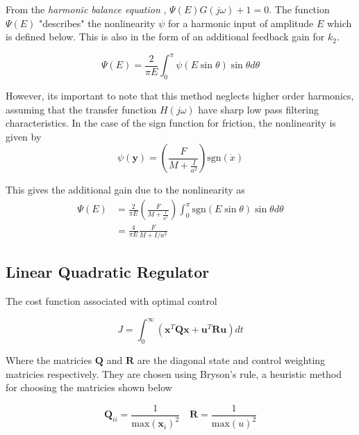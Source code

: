 \documentclass{article}
\begin{document}
From the \textit{harmonic balance equation} \cite{non_linear_systems}, $\Psi(E)G(j\omega) + 1 = 0$.
The function $\Psi(E)$ "describes" the nonlinearity $\psi$ for a harmonic input of amplitude $E$ which is defined below.
This is also in the form of an additional feedback gain for $k_2$.

\begin{equation}
  \Psi(E) = \frac{2}{\pi E} \int_0^{\pi} \psi(E\sin\theta)\sin\theta d\theta
\end{equation}

However, its important to note that this method neglects higher order harmonics, assuming that the transfer function $H(j\omega)$ have sharp low pass filtering characteristics.
In the case of the sign function for friction, the nonlinearity is given by 
\begin{equation}
  \psi(\mathbf{y}) = \left(\frac{F}{M + \frac{I}{a^2}} \right) \text{sgn}(\dot{x})
\end{equation}

This gives the additional gain due to the nonlinearity as
\begin{align}
  \Psi(E) &= \frac{2}{\pi E} \left(\frac{F}{M + \frac{I}{a^2}} \right) \int_0^{\pi} \text{sgn}(E\sin\theta)\sin\theta d\theta \\
          &= \frac{4}{\pi E} \frac{F}{M + I/{a^2}} \label{eq:additional_k2}
\end{align}


\subsection{Linear Quadratic Regulator}

The cost function associated with optimal control

\begin{equation}
  J = \int_0^\infty \left( \mathbf{x}^T \mathbf{Q} \mathbf{x} + \mathbf{u}^T \mathbf{R} \mathbf{u} \right) dt
\end{equation}

Where the matricies $\mathbf{Q}$ and $\mathbf{R}$ are the diagonal state and control weighting matricies respectively.
They are chosen using Bryson's rule, a heuristic method for choosing the matricies shown below 

\begin{equation}
  \mathbf{Q}_{ii} = \frac{1}{\text{max}(\mathbf{x}_i)^2} \quad \mathbf{R} = \frac{1}{\text{max}(u)^2}
\end{equation}
\end{document}
